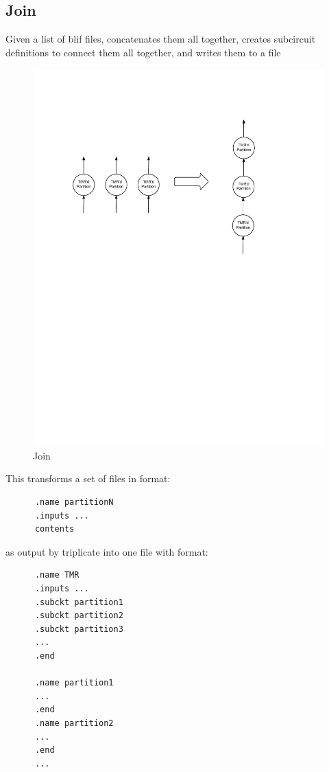 \documentclass[12pt,final,oneside]{dwThesis} %
\begin{document}
   \subsection{Join}\label{algJoin}
   Given a list of blif files, concatenates them all together, creates
   subcircuit definitions to connect them all together, and writes them to a file
   \begin{figure}
      \begin{center}
         \includegraphics[width=\linewidth]{images/Join.pdf}
         \caption{Join}
         \label{imJoin}
      \end{center}
   \end{figure}

   This transforms a set of files in format:
   \begin{lstlisting}
      .name partitionN
      .inputs ...
      contents
   \end{lstlisting}
   as output by triplicate into one file with format:
   \begin{lstlisting}
      .name TMR
      .inputs ...
      .subckt partition1
      .subckt partition2
      .subckt partition3
      ...
      .end

      .name partition1
      ...
      .end
      .name partition2
      ...
      .end
      ...
   \end{lstlisting}
   \newpage
\end{document}
